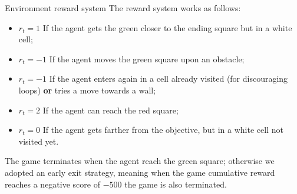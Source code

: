 \documentclass{beamer}
\begin{document}
\begin{frame}{Environment reward system}
	The reward system works as follows:
	\begin{itemize}
		\item $r_t = 1$ If the agent gets the green closer to the ending square but in a white cell;
		\item $r_t = -1$ If the agent moves the green square upon an obstacle;
		\item $r_t = -1$ If the agent enters again in a cell already visited (for discouraging loops) \textbf{or} tries a move towards a wall;
		\item $r_t = 2$ If the agent can reach the red square;
		\item $r_t = 0$ If the agent gets farther from the objective, but in a white cell not visited yet.
	\end{itemize}
	The game terminates when the agent reach the green square; otherwise we adopted an early exit strategy, meaning when the game cumulative reward reaches a negative score of $-500$ the game is also terminated. 
\end{frame}
\end{document}
